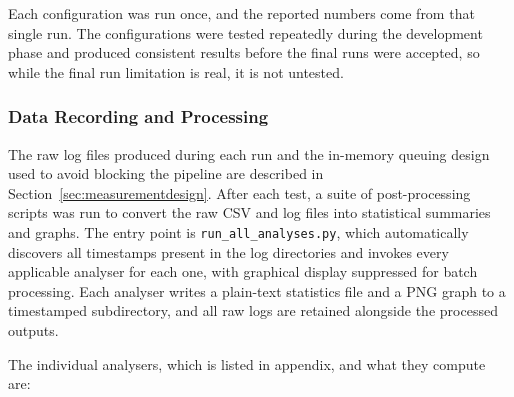 Each configuration was run once, and the reported numbers come from that single run. The configurations were tested repeatedly during the development phase and produced consistent results before the final runs were accepted, so while the final run limitation is real, it is not untested.

\subsubsection{Data Recording and Processing}

The raw log files produced during each run and the in-memory queuing design used to avoid blocking the pipeline are described in Section~\ref{sec:measurementdesign}. After each test, a suite of post-processing scripts was run to convert the raw CSV and log files into statistical summaries and graphs. The entry point is \texttt{run\_all\_analyses.py}, which automatically discovers all timestamps present in the log directories and invokes every applicable analyser for each one, with graphical display suppressed for batch processing. Each analyser writes a plain-text statistics file and a PNG graph to a timestamped subdirectory, and all raw logs are retained alongside the processed outputs.

The individual analysers, which is listed in appendix, and what they compute are:


